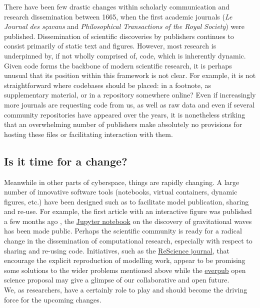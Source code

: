 \documentclass[jou]{apa6}
\begin{document}
There have been few drastic changes within scholarly communication and research dissemination between 1665, when the first academic journals (\textit{Le Journal des sçavans} and \textit{Philosophical Transactions of the Royal Society}) were published.
Dissemination of scientific discoveries by publishers continues to consist primarily of static text and figures.
However, most research is underpinned by, if not wholly comprised of, code, which is inherently dynamic.
Given code forms the backbone of modern scientific research, it is perhaps unusual that its position within this framework is not clear.
For example, it is not straightforward where codebases should be placed: in a footnote, as supplementary material, or in a repository somewhere online?
Even if increasingly more journals are requesting code from us, as well as raw data and even if several community repositories have appeared over the years, it is nonetheless striking that an overwhelming number of publishers make absolutely no provisions for hosting these files or facilitating interaction with them.


\subsection*{Is it time for a change?}

Meanwhile in other parts of cyberspace, things are rapidly changing.
A large number of innovative software tools (notebooks, virtual containers, dynamic figures, etc.) have been designed such as to facilitate model publication, sharing and re-use.
For example, the first article with an interactive figure was published a few months ago \cite{ogrean16}, the \href{http://jupyter.org}{Jupyter notebook} on the discovery of gravitational waves has been made public.
Perhaps the scientific community is ready for a radical change in the dissemination of computational research, especially with respect to sharing and re-using code.
Initiatives, such as the \href{http://rescience.github.io}{ReScience journal}, that encourage the explicit reproduction of modelling work, appear to be promising some solutions to the wider problems mentioned above while the \href{https://github.com/everpub}{everpub} open science proposal may give a glimpse of our collaborative and open future.\\

We, as researchers, have a certainly role to play and should become the driving force for the upcoming changes.





\hspace*{1cm}
\end{document}
